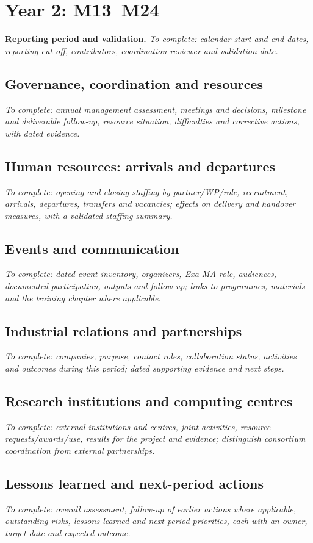 \clearpage
\section{Year 2: M13--M24}
\label{sec:management-year-2}

\textbf{Reporting period and validation.}
\emph{To complete: calendar start and end dates, reporting cut-off, contributors,
coordination reviewer and validation date.}

\subsection{Governance, coordination and resources}
\emph{To complete: annual management assessment, meetings and decisions,
milestone and deliverable follow-up, resource situation, difficulties and
corrective actions, with dated evidence.}

\subsection{Human resources: arrivals and departures}
\emph{To complete: opening and closing staffing by partner/WP/role, recruitment,
arrivals, departures, transfers and vacancies; effects on delivery and handover
measures, with a validated staffing summary.}

\subsection{Events and communication}
\emph{To complete: dated event inventory, organizers, Exa-MA role, audiences,
documented participation, outputs and follow-up; links to programmes, materials
and the training chapter where applicable.}

\subsection{Industrial relations and partnerships}
\emph{To complete: companies, purpose, contact roles, collaboration status,
activities and outcomes during this period; dated supporting evidence and
next steps.}

\subsection{Research institutions and computing centres}
\emph{To complete: external institutions and centres, joint activities,
resource requests/awards/use, results for the project and evidence;
distinguish consortium coordination from external partnerships.}

\subsection{Lessons learned and next-period actions}
\emph{To complete: overall assessment, follow-up of earlier actions where
applicable, outstanding risks, lessons learned and next-period priorities,
each with an owner, target date and expected outcome.}

